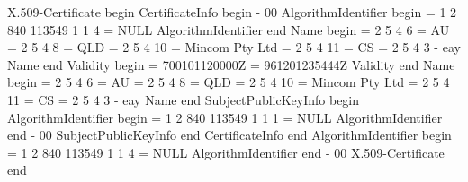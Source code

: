 X.509-Certificate begin
CertificateInfo begin
- 00
AlgorithmIdentifier begin
= 1 2 840 113549 1 1 4
= NULL
AlgorithmIdentifier end
Name begin
= 2 5 4 6
= AU
= 2 5 4 8
= QLD
= 2 5 4 10
= Mincom Pty Ltd
= 2 5 4 11
= CS
= 2 5 4 3
- eay
Name end
Validity begin
= 700101120000Z
= 961201235444Z
Validity end
Name begin
= 2 5 4 6
= AU
= 2 5 4 8
= QLD
= 2 5 4 10
= Mincom Pty Ltd
= 2 5 4 11
= CS
= 2 5 4 3
- eay
Name end
SubjectPublicKeyInfo begin
AlgorithmIdentifier begin
= 1 2 840 113549 1 1 1
= NULL
AlgorithmIdentifier end
- 00
SubjectPublicKeyInfo end
CertificateInfo end
AlgorithmIdentifier begin
= 1 2 840 113549 1 1 4
= NULL
AlgorithmIdentifier end
- 00
X.509-Certificate end

